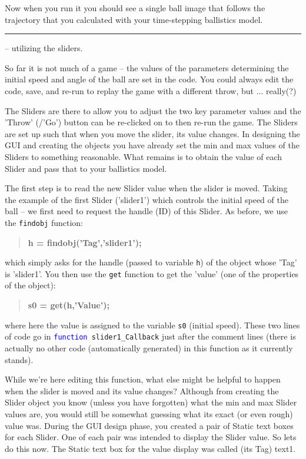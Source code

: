 \documentclass{tufte-book} %
\newenvironment{docspecbold}{\begin{quotation}\ttfamily\bfseries\parskip0pt\parindent0pt\ignorespaces}{\end{quotation}}
\begin{document}
Now when you run it you should see a single ball image that follows the  trajectory that you calculated with your time-stepping ballistics model.

\vspace{1mm}
\noindent\rule{4cm}{0.5pt}
\vspace{-2mm}

 -- utilizing the sliders.

So far it is not much of a game -- the values of the parameters determining the initial speed and angle of the ball are set in the code. You could always edit the code, save, and re-run to replay the game with a different throw, but ... really(?)

The \textsf{Sliders} are there to allow you to adjust the two key parameter values and the 'Throw' (/'Go') button can be re-clicked on to then re-run the game. The \textsf{Sliders} are set up such that when you move the slider, its value changes. In designing the GUI and creating the objects you have already set the min and max values of the \textsf{Sliders} to something reasonable. What remains is to obtain the value of each \textsf{Slider} and pass that to your ballistics model.

The first step is to read the new \textsf{Slider} value when the slider is moved. Taking the example of the first \textsf{Slider} ('\textsf{slider1}') which controls the initial speed of the ball -- we first need to request the handle (ID) of this \textsf{Slider}. As before, we use the \texttt{findobj} function:
\begin{docspecbold}
h = findobj(\textcolor[rgb]{0.501961,0,1}{'Tag'},\textcolor[rgb]{0.501961,0,1}{'slider1'});
\end{docspecbold}
which simply asks for the handle (passed to variable \texttt{h}) of the object whose '\textsf{Tag}' is '\textsf{slider1}'. You then use the \texttt{get} function to get the '\textsf{value}' (one of the properties of the object):
\begin{docspecbold}
s0 = get(h,\textcolor[rgb]{0.501961,0,1}{'Value'});
\end{docspecbold}
where here the value is assigned to the variable \texttt{s0} (initial speed). These two lines of code go in \texttt{\textcolor{blue}{function} slider1\_Callback} just after the comment lines (there is actually no other code (automatically generated) in this function as it currently stands). 

While we're here editing this function, what else might be helpful to happen when the slider is moved and its value changes? Although from creating the \textsf{Slider} object you know (unless you have forgotten) what the min and max \textsf{Slider} values are, you would still be somewhat guessing what its exact (or even rough) value was. During the GUI design phase, you created a pair of \textsf{Static text} boxes for each \textsf{Slider}. One of each pair was intended to display the \textsf{Slider} value. So lets do this now. The \textsf{Static text} box for the value display was called (its \textsf{Tag}) \textsf{text1}.
\end{document}
